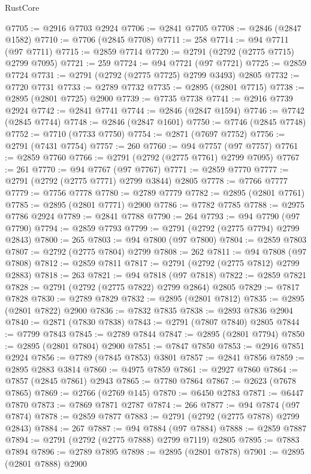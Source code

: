 \begin{lexlean}{RustCore}
\begin{coremodule}
@7705 := @2916 @7703 @2924
@7706 := @2841 @7705
@7708 := @2846 (@2847 @1582)
@7710 := @7706 (@2845 @7708)
@7711 := 258
@7714 := @94 @7711 (@97 @7711)
@7715 := @2859 @7714
@7720 := @2791 (@2792 (@2775 @7715) @2799 @7095)
@7721 := 259
@7724 := @94 @7721 (@97 @7721)
@7725 := @2859 @7724
@7731 := @2791 (@2792 (@2775 @7725) @2799 @3493) @2805
@7732 := @7720 @7731
@7733 := @2789 @7732
@7735 := @2895 (@2801 @7715)
@7738 := @2895 (@2801 @7725) @2900
@7739 := @7735 @7738
@7741 := @2916 @7739 @2924
@7742 := @2841 @7741
@7744 := @2846 (@2847 @1594)
@7746 := @7742 (@2845 @7744)
@7748 := @2846 (@2847 @1601)
@7750 := @7746 (@2845 @7748)
@7752 := @7710 (@7733 @7750)
@7754 := @2871 (@7697 @7752)
@7756 := @2791 (@7431 @7754)
@7757 := 260
@7760 := @94 @7757 (@97 @7757)
@7761 := @2859 @7760
@7766 := @2791 (@2792 (@2775 @7761) @2799 @7095)
@7767 := 261
@7770 := @94 @7767 (@97 @7767)
@7771 := @2859 @7770
@7777 := @2791 (@2792 (@2775 @7771) @2799 @3844) @2805
@7778 := @7766 @7777
@7779 := @7756 @7778
@7780 := @2789 @7779
@7782 := @2895 (@2801 @7761)
@7785 := @2895 (@2801 @7771) @2900
@7786 := @7782 @7785
@7788 := @2975 @7786 @2924
@7789 := @2841 @7788
@7790 := 264
@7793 := @94 @7790 (@97 @7790)
@7794 := @2859 @7793
@7799 := @2791 (@2792 (@2775 @7794) @2799 @2843)
@7800 := 265
@7803 := @94 @7800 (@97 @7800)
@7804 := @2859 @7803
@7807 := @2792 (@2775 @7804) @2799
@7808 := 262
@7811 := @94 @7808 (@97 @7808)
@7812 := @2859 @7811
@7817 := @2791 (@2792 (@2775 @7812) @2799 @2883)
@7818 := 263
@7821 := @94 @7818 (@97 @7818)
@7822 := @2859 @7821
@7828 := @2791 (@2792 (@2775 @7822) @2799 @2864) @2805
@7829 := @7817 @7828
@7830 := @2789 @7829
@7832 := @2895 (@2801 @7812)
@7835 := @2895 (@2801 @7822) @2900
@7836 := @7832 @7835
@7838 := @2893 @7836 @2904
@7840 := @2871 (@7830 @7838)
@7843 := @2791 (@7807 @7840) @2805
@7844 := @7799 @7843
@7845 := @2789 @7844
@7847 := @2895 (@2801 @7794)
@7850 := @2895 (@2801 @7804) @2900
@7851 := @7847 @7850
@7853 := @2916 @7851 @2924
@7856 := @7789 (@7845 @7853) @3801
@7857 := @2841 @7856
@7859 := @2895 @2883 @3814
@7860 := @4975 @7859
@7861 := @2927 @7860
@7864 := @7857 (@2845 @7861) @2943
@7865 := @7780 @7864
@7867 := @2623 (@7678 @7865)
@7869 := @2766 (@2769 @145)
@7870 := @6450 @2783
@7871 := @6447 @7870
@7873 := @7869 @7871 @2787
@7874 := 266
@7877 := @94 @7874 (@97 @7874)
@7878 := @2859 @7877
@7883 := @2791 (@2792 (@2775 @7878) @2799 @2843)
@7884 := 267
@7887 := @94 @7884 (@97 @7884)
@7888 := @2859 @7887
@7894 := @2791 (@2792 (@2775 @7888) @2799 @7119) @2805
@7895 := @7883 @7894
@7896 := @2789 @7895
@7898 := @2895 (@2801 @7878)
@7901 := @2895 (@2801 @7888) @2900

\end{coremodule}
\end{lexlean}
